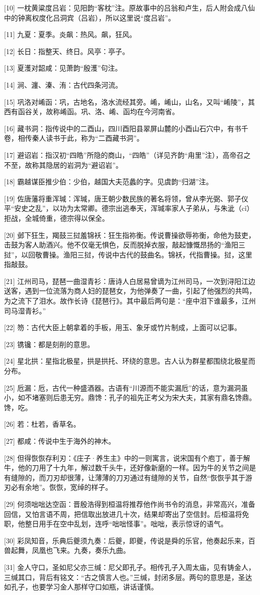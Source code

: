 \documentclass[12pt,UTF8]{ctexbook}
\begin{document}
[10] 一枕黄粱度吕岩：见阳韵“客枕”注。原故事中的吕翁和卢生，后人附会成八仙中的钟离权度化吕洞宾（吕岩），所以这里说“度吕岩”。

[11] 九夏：夏季。炎飙：热风。飙，狂风。

[12] 长日：指整天、终日。风亭：亭子。

[13] 夏濩对韶咸：见萧韵“殷濩”句注。

[14] 涧、瀍、溱、洧：古代四条河流。

[15] 巩洛对崤函：巩，古地名，洛水流经其旁。崤，崤山，山名，又叫“崤陵”，其西有函谷关，故称崤函。巩、洛、崤、函均在今河南省。

[16] 藏书洞：指传说中的二酉山，四川酉阳县翠屏山麓的小酉山石穴中，有书千卷，相传秦人读书于此，称为“二酉藏书洞”。

[17] 避诏岩：指汉初“四皓”所隐的商山，“四皓”（详见齐韵“甪里”注），高帝召之不至，故称其隐居的岩洞为“避诏岩”。

[18] 霸越谋臣推少伯：少伯，越国大夫范蠡的字。见虞韵“归湖”注。

[19] 佐唐藩将重浑瑊：浑瑊，唐王朝少数民族的著名将领，曾从李光弼、郭子仪平“安史之乱”，以功为太常卿。德宗出逃奉天，浑瑊率家人子弟从，与朱泚（cǐ）拒战，全城倚重，德宗得以保全。

[20] 邺下狂生，羯鼓三挝羞锦袄：狂生指祢衡。传说曹操欲辱祢衡，命他为鼓吏，击鼓为客人助酒兴。他不仅毫无惧色，反而脱掉衣服，敲起慷慨昂扬的“渔阳三挝”，以回敬曹操。渔阳三挝，传说中古代的鼓曲名。锦袄，代指曹操。挝，这里指敲鼓。

[21] 江州司马，琵琶一曲湿青衫：唐诗人白居易曾谪为江州司马，一次到浔阳江边送客，遇到一位流落为商人妇的琵琶女，为他弹奏了一曲，引起了他强烈的共鸣，为之流下了泪水。故作长诗《琵琶行》。其中最后两句是：“座中泪下谁最多，江州司马湿青衫。”

[22] 笏：古代大臣上朝拿着的手板，用玉、象牙或竹片制成，上面可以记事。

[23] 镌镵：都是刻削的意思。

[24] 星北拱：星指北极星，拱是拱托、环绕的意思。古人认为群星都围绕北极星而分布。

[25] 卮漏：卮，古代一种盛酒器。古语有“川源而不能实漏卮”的话，意为漏洞虽小，如不堵塞则后患无穷。鼎馋：孔子的祖先正考父为宋大夫，其家有鼎名馋鼎。馋，吃。

[26] 若：杜若，香草名。

[27] 都咸：传说中生于海外的神木。

[28] 但得恢恢存利刃：《庄子·养生主》中的一则寓言，说宋国有个庖丁，善于解牛，他的刀用了十九年，解过数千头牛，还好像新磨的一样。因为牛的关节之间是有缝隙的，而刀刃却很薄，让薄薄的刀刃通过有缝隙的关节，自然“恢恢乎其于游刃必有余地”。恢恢，宽绰的样子。

[29] 何须咄咄达空函：晋殷浩得到桓温将推荐他作尚书令的消息，非常高兴，准备回信，又怕言语不周，把信取出放进几十次，结果却寄出了空信封。后桓温将免职，他整日用手在空中乱划，连呼“咄咄怪事”。咄咄，表示惊讶的语气。

[30] 彩凤知音，乐典后夔须九奏：后夔，即夔，传说是舜的乐官，他奏起乐来，百兽起舞，凤凰也飞来。九奏，奏乐九曲。

[31] 金人守口，圣如尼父亦三缄：尼父即孔子。相传孔子入周太庙，见有铸金人，三缄其口，背后有铭文：“古之慎言人也。”三缄，封闭多层。两句的意思是，圣达如孔子，也要学习金人那样守口如瓶，讲话谨慎。

\backmatter
\end{document}
